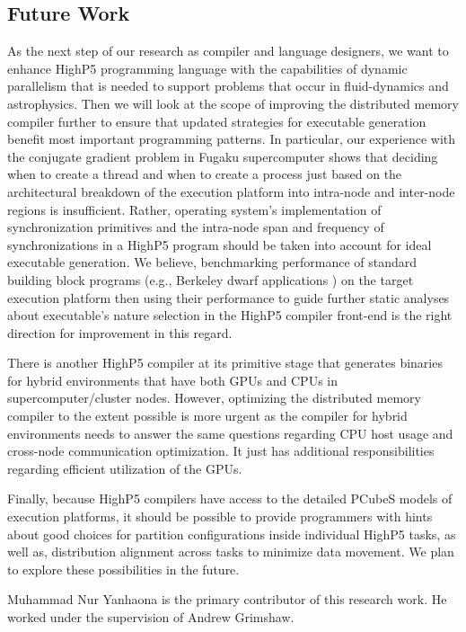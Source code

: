 \documentclass[ASNA,twocolumn]{USG} %
\begin{document}
{\subsection{Future Work}
As the next step of our research as compiler and language designers, we want to enhance HighP5 programming language with the capabilities of dynamic parallelism that is needed to support problems that occur in fluid-dynamics and astrophysics. Then we will look at the scope of improving the distributed memory compiler further to ensure that updated strategies for executable generation benefit most important programming patterns. 
{\color{red}
In particular, our experience with the conjugate gradient problem in Fugaku supercomputer shows that deciding when to create a thread and when to create a process just based on the architectural breakdown of the execution platform into intra-node and inter-node regions is insufficient. Rather, operating system's implementation of synchronization primitives and the intra-node span and frequency of synchronizations in a HighP5 program should be taken into account for ideal executable generation. We believe, benchmarking performance of standard building block programs (e.g., Berkeley dwarf applications \citep{asanovic2006landscape}) on the target execution platform then using their performance to guide further static analyses about executable's nature selection in the HighP5 compiler front-end is the right direction for improvement in this regard.
}

There is another HighP5 compiler at its primitive stage that generates binaries for hybrid environments that have both GPUs and CPUs in supercomputer/cluster nodes. However, optimizing the distributed memory compiler to the extent possible is more urgent as the compiler for hybrid environments needs to answer the same questions regarding CPU host usage and cross-node communication optimization. It just has additional responsibilities regarding efficient utilization of the GPUs.

{\color{red}
Finally, because HighP5 compilers have access to the detailed PCubeS models of execution platforms, it should be possible to provide programmers with hints about good choices for partition configurations inside individual HighP5 tasks, as well as, distribution alignment across tasks to minimize data movement. We plan to explore these possibilities in the future.     
}    


{}
Muhammad Nur Yanhaona is the primary contributor of this research work. He worked under the supervision of Andrew Grimshaw.

}
\end{document}
